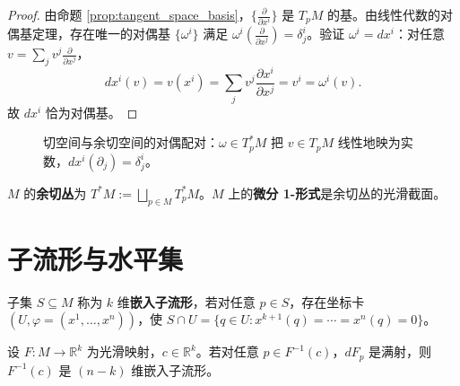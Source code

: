 \begin{proof}
由命题 \ref{prop:tangent_space_basis}，$\{\frac{\partial}{\partial x^i}\}$ 是 $T_pM$ 的基。由线性代数的对偶基定理，存在唯一的对偶基 $\{\omega^i\}$ 满足 $\omega^i(\frac{\partial}{\partial x^j}) = \delta_j^i$。验证 $\omega^i = dx^i$：对任意 $v = \sum_j v^j \frac{\partial}{\partial x^j}$，
\[
dx^i(v) = v(x^i) = \sum_j v^j \frac{\partial x^i}{\partial x^j} = v^i = \omega^i(v).
\]
故 $dx^i$ 恰为对偶基。
\end{proof}

\begin{figure}[htbp]
\centering
{}
\caption{切空间与余切空间的对偶配对：$\omega\in T_p^*M$ 把 $v\in T_pM$ 线性地映为实数，$dx^i(\partial_j)=\delta^i_j$。}
\label{fig:cotangent_pairing}
\end{figure}

\begin{definition}[余切丛]\label{def:cotangent_bundle}
$M$ 的\textbf{余切丛}为 $T^*M := \bigsqcup_{p \in M} T_p^*M$。$M$ 上的\textbf{微分 1-形式}是余切丛的光滑截面。
\end{definition}

\section{子流形与水平集}

\begin{definition}[嵌入子流形]\label{def:embedded_submanifold}
子集 $S \subseteq M$ 称为 $k$ 维\textbf{嵌入子流形}，若对任意 $p \in S$，存在坐标卡 $(U, \varphi = (x^1, \dots, x^n))$，使 $S \cap U = \{q \in U : x^{k+1}(q) = \cdots = x^n(q) = 0\}$。
\end{definition}

\begin{theorem}[正则水平集定理]\label{thm:regular_level_set}
设 $F: M \to \mathbb{R}^k$ 为光滑映射，$c \in \mathbb{R}^k$。若对任意 $p \in F^{-1}(c)$，$dF_p$ 是满射，则 $F^{-1}(c)$ 是 $(n-k)$ 维嵌入子流形。
\end{theorem}

